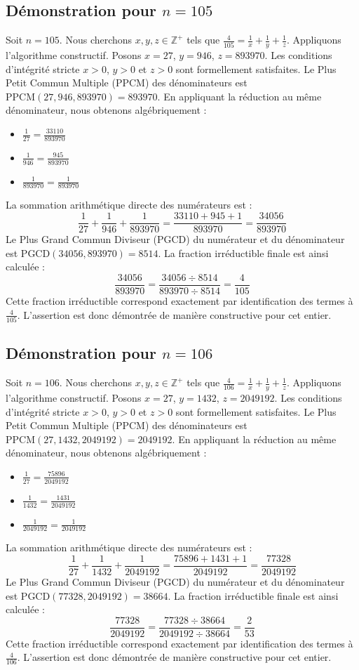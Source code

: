 \documentclass[11pt,a4paper]{article}
\begin{document}
\subsection{Démonstration pour $n = 105$}
Soit $n = 105$. Nous cherchons $x, y, z \in \mathbb{Z}^{+}$ tels que $\frac{4}{105} = \frac{1}{x} + \frac{1}{y} + \frac{1}{z}$.
Appliquons l'algorithme constructif. Posons $x = 27$, $y = 946$, $z = 893970$.
Les conditions d'intégrité stricte $x > 0$, $y > 0$ et $z > 0$ sont formellement satisfaites.
Le Plus Petit Commun Multiple (PPCM) des dénominateurs est $\text{PPCM}(27, 946, 893970) = 893970$.
En appliquant la réduction au même dénominateur, nous obtenons algébriquement :
\begin{itemize}
    \item $\frac{1}{27} = \frac{33110}{893970}$
    \item $\frac{1}{946} = \frac{945}{893970}$
    \item $\frac{1}{893970} = \frac{1}{893970}$
\end{itemize}
La sommation arithmétique directe des numérateurs est :
$$ \frac{1}{27} + \frac{1}{946} + \frac{1}{893970} = \frac{33110 + 945 + 1}{893970} = \frac{34056}{893970} $$
Le Plus Grand Commun Diviseur (PGCD) du numérateur et du dénominateur est $\text{PGCD}(34056, 893970) = 8514$.
La fraction irréductible finale est ainsi calculée :
$$ \frac{34056}{893970} = \frac{34056 \div 8514}{893970 \div 8514} = \frac{4}{105} $$
Cette fraction irréductible correspond exactement par identification des termes à $\frac{4}{105}$. L'assertion est donc démontrée de manière constructive pour cet entier.

\subsection{Démonstration pour $n = 106$}
Soit $n = 106$. Nous cherchons $x, y, z \in \mathbb{Z}^{+}$ tels que $\frac{4}{106} = \frac{1}{x} + \frac{1}{y} + \frac{1}{z}$.
Appliquons l'algorithme constructif. Posons $x = 27$, $y = 1432$, $z = 2049192$.
Les conditions d'intégrité stricte $x > 0$, $y > 0$ et $z > 0$ sont formellement satisfaites.
Le Plus Petit Commun Multiple (PPCM) des dénominateurs est $\text{PPCM}(27, 1432, 2049192) = 2049192$.
En appliquant la réduction au même dénominateur, nous obtenons algébriquement :
\begin{itemize}
    \item $\frac{1}{27} = \frac{75896}{2049192}$
    \item $\frac{1}{1432} = \frac{1431}{2049192}$
    \item $\frac{1}{2049192} = \frac{1}{2049192}$
\end{itemize}
La sommation arithmétique directe des numérateurs est :
$$ \frac{1}{27} + \frac{1}{1432} + \frac{1}{2049192} = \frac{75896 + 1431 + 1}{2049192} = \frac{77328}{2049192} $$
Le Plus Grand Commun Diviseur (PGCD) du numérateur et du dénominateur est $\text{PGCD}(77328, 2049192) = 38664$.
La fraction irréductible finale est ainsi calculée :
$$ \frac{77328}{2049192} = \frac{77328 \div 38664}{2049192 \div 38664} = \frac{2}{53} $$
Cette fraction irréductible correspond exactement par identification des termes à $\frac{4}{106}$. L'assertion est donc démontrée de manière constructive pour cet entier.
\end{document}

